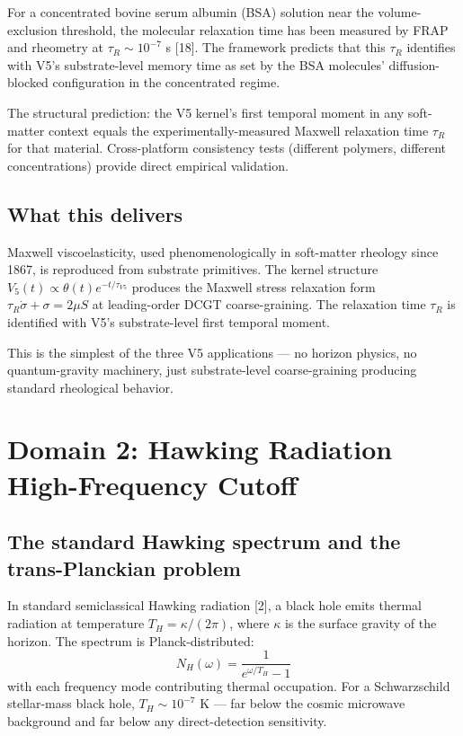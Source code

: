 \documentclass[11pt,a4paper]{article}
\begin{document}
For a concentrated bovine serum albumin (BSA) solution near the volume-exclusion threshold, the molecular relaxation time has been measured by FRAP and rheometry at $\tau_R \sim 10^{-7}$ s [18]. The framework predicts that this $\tau_R$ identifies with V5's substrate-level memory time as set by the BSA molecules' diffusion-blocked configuration in the concentrated regime.

The structural prediction: the V5 kernel's first temporal moment in any soft-matter context equals the experimentally-measured Maxwell relaxation time $\tau_R$ for that material. Cross-platform consistency tests (different polymers, different concentrations) provide direct empirical validation.

\subsection{What this delivers}

Maxwell viscoelasticity, used phenomenologically in soft-matter rheology since 1867, is reproduced from substrate primitives. The kernel structure $V_5(t) \propto \theta(t) e^{-t/\tau_{V5}}$ produces the Maxwell stress relaxation form $\tau_R \dot\sigma + \sigma = 2\mu S$ at leading-order DCGT coarse-graining. The relaxation time $\tau_R$ is identified with V5's substrate-level first temporal moment.

This is the simplest of the three V5 applications --- no horizon physics, no quantum-gravity machinery, just substrate-level coarse-graining producing standard rheological behavior.

\section{Domain 2: Hawking Radiation High-Frequency Cutoff}

\subsection{The standard Hawking spectrum and the trans-Planckian problem}

In standard semiclassical Hawking radiation [2], a black hole emits thermal radiation at temperature $T_H = \kappa/(2\pi)$, where $\kappa$ is the surface gravity of the horizon. The spectrum is Planck-distributed:
\[
N_H(\omega) = \frac{1}{e^{\omega/T_H} - 1}
\]
with each frequency mode contributing thermal occupation. For a Schwarzschild stellar-mass black hole, $T_H \sim 10^{-7}$ K --- far below the cosmic microwave background and far below any direct-detection sensitivity.
\end{document}

